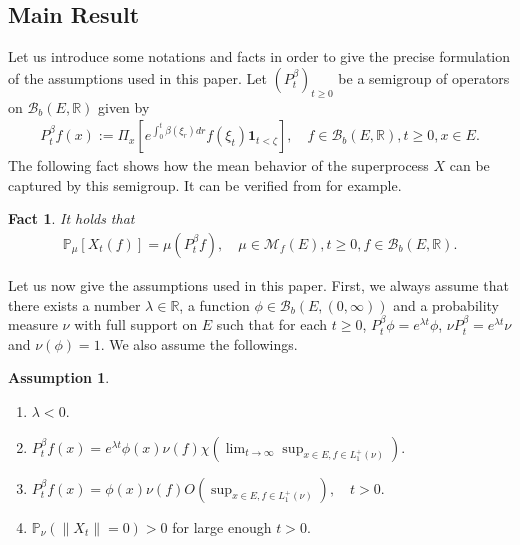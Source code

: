 \documentclass[12pt,a4paper]{amsart}
\numberwithin{equation}{section}
\theoremstyle{plain}
\newtheorem{fact}[thm]{Fact}
\theoremstyle{definition}
\newtheorem*{asp*}{Assumption}
\theoremstyle{remark}
\begin{document}
\subsection{Main Result}
Let us introduce some notations and facts in order to give the precise formulation of the assumptions used in this paper.
Let $(P_t^\beta)_{t\geq 0}$ be a semigroup of operators on $\mathcal B_b(E,\mathbb R)$ given by 
\begin{align} 
P_t^\beta f(x)
:= \Pi_x[e^{\int_0^t \beta(\xi_r)dr }f(\xi_t) \mathbf 1_{t < \zeta}], 
\quad f\in \mathcal B_b(E,\mathbb R), t\geq 0, x\in E.
\end{align}
The following fact shows how the mean behavior of the superprocess $X$ can be captured by this semigroup. 
It can be verified from \cite[Proposition 2.27]{Li2011MeasureValued} for example.
\begin{fact} \label{Fact:M!} 
It holds that
\begin{align}
\mathbb P_\mu[X_t(f)] 
= \mu (P_t^\beta f), 
\quad \mu \in \mathcal M_f(E), t\geq 0, f \in \mathcal B_b(E,\mathbb R).
\end{align}
\end{fact}
\par
Let us now give the assumptions used in this paper. 
First, we always assume that there exists a number $\lambda \in \mathbb R$, a function $\phi \in \mathcal B_b(E,(0,\infty))$ and a probability measure $\nu$ with full support on $E$ such that for each $t\geq 0$, $P_t^\beta \phi = e^{\lambda t}\phi$, $\nu P_t^\beta = e^{\lambda t} \nu$ and $\nu(\phi) = 1$.
We also assume the followings.
\begin{asp*}
\begin{enumerate}[label =(H\arabic*)]
\item \label{Assumption:H1!}
$\lambda < 0$.
\item \label{Assumption:H2!} 
$
P_t^\beta f(x) 
= e^{\lambda t} \phi(x) \nu(f) \chi( \lim_{t\to \infty} \sup_{x\in E, f\in L_1^+(\nu)}).
$
\item \label{Assumption:H3!}
$
P_t^\beta f(x) 
= \phi(x) \nu(f) O(\sup_{x\in E, f \in L_1^+(\nu)}),
\quad t>0.
$
\item \label{Assumption:H4!}
$\mathbb P_\nu(\|X_t\| = 0)>0$ for large enough $t>0$.
\end{enumerate}
\end{asp*}
\end{document}
